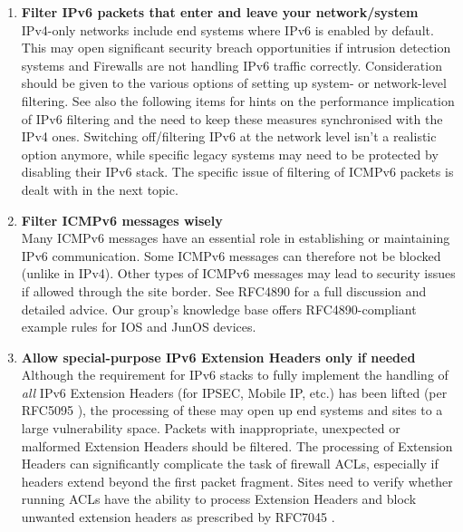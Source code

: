 \begin{enumerate}
\item {\bf Filter IPv6 packets that enter and leave your network/system}\\
IPv4-only networks include end systems where IPv6 is enabled by default.
This may open significant security breach opportunities
if intrusion detection systems and Firewalls are not handling IPv6 traffic correctly.
Consideration should be given to the various options of setting
up system- or network-level filtering. See also the following items
for hints on the performance implication of IPv6 filtering and the
need to keep these measures synchronised with the IPv4 ones.
Switching off/filtering IPv6 at the network level isn't a realistic
option anymore, while specific legacy systems may need to be protected
by disabling their IPv6 stack.
The specific issue of filtering of ICMPv6 packets is dealt with in the
next topic. 


\item {\bf Filter ICMPv6 messages wisely} \\
Many ICMPv6 messages have an essential role in establishing or maintaining
IPv6 communication.
Some ICMPv6 messages can therefore not be blocked (unlike in IPv4).
Other types of ICMPv6 messages may lead to security issues if allowed through
the site border. See RFC4890 \cite{rfc} for a full discussion and detailed advice.
Our group's knowledge base \cite{ipv6wg} offers RFC4890-compliant example
rules for IOS and JunOS devices.


\item {\bf Allow special-purpose IPv6 Extension Headers only if needed} \\
Although the requirement for IPv6 stacks to fully implement the handling
of {\it all} IPv6 Extension Headers (for IPSEC, Mobile IP, etc.) has been lifted
(per RFC5095 \cite{rfc}),
the processing of these may open up end systems and sites to a large
vulnerability space. 
Packets with inappropriate, unexpected or malformed Extension Headers should
be filtered. The processing of Extension Headers can significantly complicate the
task of firewall ACLs, especially if headers extend beyond the first packet
fragment.
Sites need to verify whether running ACLs have the ability to process Extension
Headers and block unwanted extension headers as prescribed by RFC7045
\cite{rfc}.



\end{enumerate}
